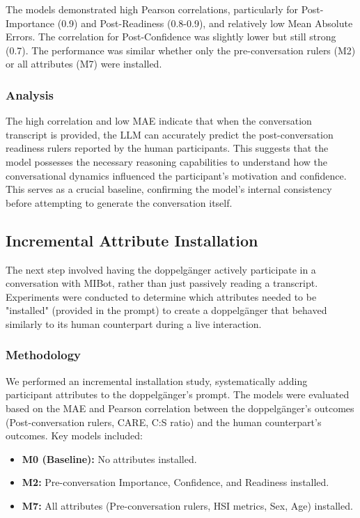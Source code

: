 The models demonstrated high Pearson correlations, particularly for Post-Importance (0.9) and Post-Readiness (0.8-0.9), and relatively low Mean Absolute Errors. The correlation for Post-Confidence was slightly lower but still strong (0.7). The performance was similar whether only the pre-conversation rulers (M2) or all attributes (M7) were installed.

\subsubsection{Analysis}

The high correlation and low MAE indicate that when the conversation transcript is provided, the LLM can accurately predict the post-conversation readiness rulers reported by the human participants. This suggests that the model possesses the necessary reasoning capabilities to understand how the conversational dynamics influenced the participant's motivation and confidence. This serves as a crucial baseline, confirming the model's internal consistency before attempting to generate the conversation itself.

\subsection{Incremental Attribute Installation}

The next step involved having the doppelgänger actively participate in a conversation with MIBot, rather than just passively reading a transcript. Experiments were conducted to determine which attributes needed to be "installed" (provided in the prompt) to create a doppelgänger that behaved similarly to its human counterpart during a live interaction.

\subsubsection{Methodology}

We performed an incremental installation study, systematically adding participant attributes to the doppelgänger's prompt. The models were evaluated based on the MAE and Pearson correlation between the doppelgänger's outcomes (Post-conversation rulers, CARE, C:S ratio) and the human counterpart's outcomes. Key models included:
\begin{itemize}
    \item \textbf{M0 (Baseline):} No attributes installed.
    \item \textbf{M2:} Pre-conversation Importance, Confidence, and Readiness installed.
    \item \textbf{M7:} All attributes (Pre-conversation rulers, HSI metrics, Sex, Age) installed.
\end{itemize}


